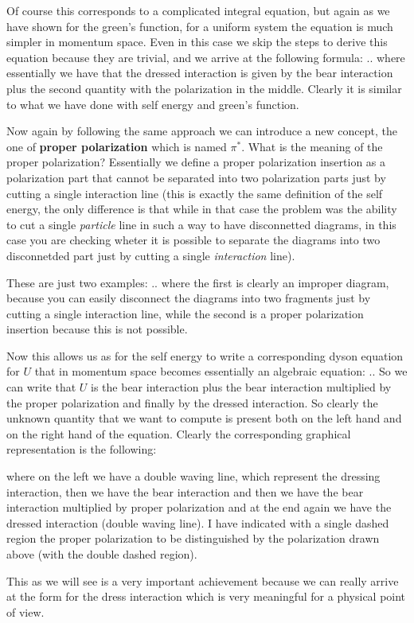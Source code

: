 \documentclass[../main/main.tex]{subfiles}
\begin{document}
Of course this corresponds to a complicated integral equation, but again as we have shown for the green's function, for a uniform system the equation is much simpler in momentum space. Even in this case we skip the steps to derive this equation because they are trivial, and we arrive at the following formula:
..
where essentially we have that the dressed interaction is given by the bear interaction plus the second quantity with the polarization in the middle. Clearly it is similar to what we have done with self energy and green's function.

Now again by following the same approach we can introduce a new concept, the one of \textbf{proper polarization} which is named \( \pi ^* \). What is the meaning of the proper polarization?
Essentially we define a proper polarization insertion as a polarization part that cannot be separated into two polarization parts just by cutting a single interaction line (this is exactly the same definition of the self energy, the only difference is that while in that case the problem was the ability to cut a single \emph{particle}  line in such a way to have disconnetted diagrams, in this case you are checking wheter it is possible to separate the diagrams into two disconnetded part just by cutting a single \emph{interaction}  line).

These are just two examples:
..
where the first is clearly an improper diagram, because you can easily disconnect the diagrams into two fragments just by cutting a single interaction line, while the second is a proper polarization insertion because this is not possible.

Now this allows us as for the self energy to write a corresponding dyson equation for \( U \) that in momentum space becomes essentially an algebraic equation:
..
So we can write that \( U \) is the bear interaction plus the bear interaction multiplied by the proper polarization and finally by the dressed interaction. So clearly the unknown quantity that we want to compute is present both on the left hand and on the right hand of the equation. Clearly the corresponding graphical representation is the following:

where on the left we have a double waving line, which represent the dressing interaction, then we have the bear interaction and then we have the bear interaction multiplied by proper polarization and at the end again we have the dressed interaction (double waving line).
I have indicated with a single dashed region the proper polarization to be distinguished by the polarization drawn above (with the double dashed region).

This as we will see is a very important achievement because we can really arrive at the form for the dress interaction which is very meaningful for a physical point of view.
\end{document}
